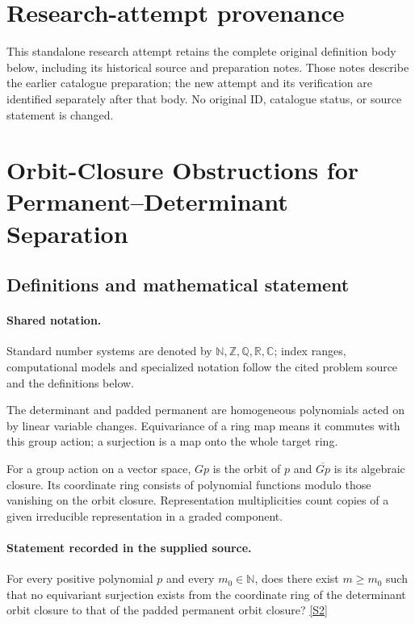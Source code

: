 \documentclass[11pt]{article}
\begin{document}
\section*{Research-attempt provenance}
This standalone research attempt retains the complete original definition body below,
including its historical source and preparation notes. Those notes describe the
earlier catalogue preparation; the new attempt and its verification are identified
separately after that body. No original ID, catalogue status, or source statement is changed.

\section{Orbit-Closure Obstructions for Permanent–Determinant Separation}\label{statement}

\subsection{Definitions and mathematical statement}

\paragraph{Shared notation.}Standard number systems are denoted by $\mathbb N,\mathbb Z,\mathbb Q,\mathbb R,\mathbb C$; index ranges, computational models and specialized notation follow the cited problem source and the definitions below.


The determinant and padded permanent are homogeneous polynomials acted on by linear variable changes. Equivariance of a ring map means it commutes with this group action; a surjection is a map onto the whole target ring.

For a group action on a vector space, $Gp$ is the orbit of $p$ and $\overline{Gp}$ is its algebraic closure. Its coordinate ring consists of polynomial functions modulo those vanishing on the orbit closure. Representation multiplicities count copies of a given irreducible representation in a graded component.
\paragraph{Statement recorded in the supplied source.}
For every positive polynomial $p$ and every $m_0\in\mathbb{N}$, does there exist $m\geq m_0$ such that no equivariant surjection exists from the coordinate ring of the determinant orbit closure to that of the padded permanent orbit closure? \href{https://doi.org/10.4171/owr/2009/52}{[S2]}
\end{document}

